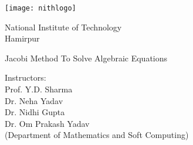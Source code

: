\documentclass[main.tex]{subfiles}
\begin{document}
    \begin{center}
    \texttt{[image: nithlogo]}

    {\huge National Institute of Technology \\
    Hamirpur \\}

    \vspace{50mm}
    
    {\LARGE \color{teal} Jacobi Method To Solve Algebraic Equations}

    \vspace{35mm}
    Instructors: \\
    \vspace{1mm}
    Prof. Y.D. Sharma\\
    \vspace{1mm}
    Dr. Neha Yadav\\
    \vspace{1mm}
    Dr. Nidhi Gupta\\ 
    \vspace{1mm}
    Dr. Om Prakash Yadav 
    \vspace{2mm}
    \\ (Department of Mathematics and Soft Computing)
    \end{center}
\end{document}
